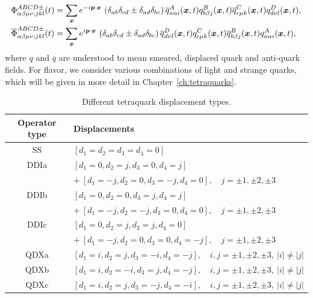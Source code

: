     \begin{equation}
        \begin{aligned}
            \Phi_{\alpha \beta \mu \nu ; j k l}^{A B C D \pm}(t)&=\sum_{\boldsymbol{x}}e^{-i\boldsymbol{p} \cdot \boldsymbol{x}}\, \left(\delta_{a b} \delta_{c d} \pm \delta_{a d} \delta_{b c}\right) \overline{q}_{a \alpha i}^{A}(\boldsymbol{x}, t) q_{b \beta j}^{B}(\boldsymbol{x}, t) \overline{q}_{c \mu k}^{C}(\boldsymbol{x}, t) q_{d \nu l}^{D}(\boldsymbol{x}, t), \\
            \overline{\Phi}_{\alpha \beta \mu \nu ; j k l}^{A B C D \pm}(t)&=\sum_{\boldsymbol{x}} e^{i\boldsymbol{p} \cdot \boldsymbol{x}}\, \left(\delta_{a b} \delta_{c d} \pm \delta_{a d} \delta_{b c}\right) \overline{q}_{d \nu l}^{D}(\boldsymbol{x}, t) q_{c \mu k}^{C}(\boldsymbol{x}, t) \overline{q}_{b \beta j}^{B}(\boldsymbol{x}, t) q_{a \alpha i}^{A}(\boldsymbol{x}, t),
        \end{aligned}
    \end{equation}
    where $q$ and $\overline q$ are understood to mean smeared, displaced quark and anti-quark fields. For flavor, we consider various combinations of light and strange quarks, which will be given in more detail in Chapter~\ref{ch:tetraquarks}.
    \begin{table}
        \centering
        \begin{tabular}{|cl|}\hline
        Operator type & Displacements\\ \hline\hline
        SS  &  $[d_1=d_2=d_3=d_4=0]$ \\\hline
        DDIa  & $[d_1=0, d_2=j, d_3=0, d_4=j]$ \\ & $+ \ [d_1=-j, d_2=0, d_3=-j, d_4=0],\quad j=\pm 1,\pm 2,\pm 3$ \\\hline
        DDIb  & $[d_1=0, d_2=0, d_3=j, d_4=j]$ \\ & $+ \ [d_1=-j, d_2=-j, d_3=0, d_4=0],\quad j=\pm 1,\pm 2,\pm 3$ \\\hline
        DDIc  & $[d_1=0,  d_2=j, d_3=j, d_4=0]$ \\ & $+\ [d_1=-j, d_2=0, d_3=0, d_4=-j],\quad j=\pm 1,\pm 2,\pm 3$ \\\hline
        QDXa  & $[d_1=i, d_2=j,  d_3=-i, d_4=-j],\quad i,j=\pm 1,\pm 2,\pm 3,\ \vert i\vert\neq \vert j\vert$ \\\hline
        QDXb  & $[d_1=i, d_2=-i, d_3=j,  d_4=-j],\quad i,j=\pm 1,\pm 2,\pm 3,\ \vert i\vert\neq \vert j\vert$ \\\hline
        QDXc  & $[d_1=i, d_2=j,  d_3=-j, d_4=-i],\quad i,j=\pm 1,\pm 2,\pm 3,\ \vert i\vert\neq \vert j\vert$ \\\hline
        \end{tabular}
        \caption{Different tetraquark displacement types.}
        \label{table:tetraquark_disp}
    \end{table}
